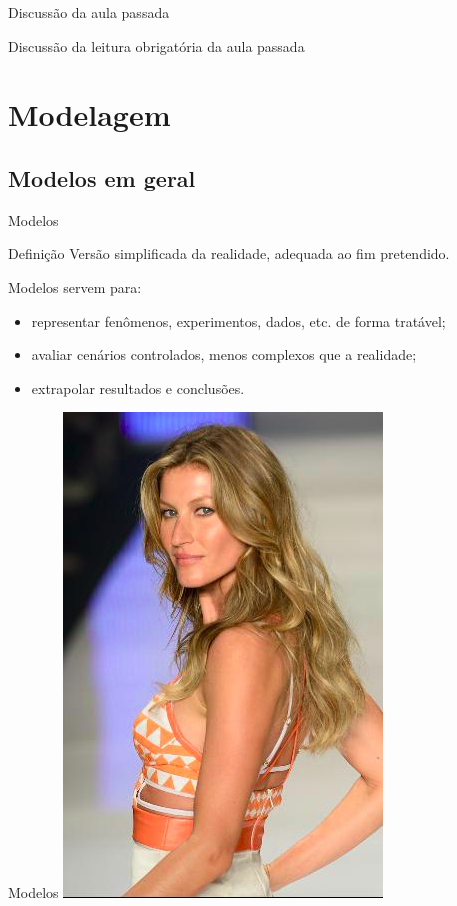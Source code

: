 \documentclass{beamer}
\begin{document}

\begin{frame}{\scriptsize Discussão da aula passada}
  \begin{block}{}
    Discussão da leitura obrigatória da aula passada
  \end{block}
\end{frame}

\section{Modelagem}

\subsection{Modelos em geral}

\begin{frame}{\scriptsize Modelos}
  \begin{block}{Definição}
    \footnotesize
    Versão simplificada da realidade, adequada ao fim pretendido.
  \end{block}
  \bigskip
  \small
  Modelos servem para:
  \begin{itemize}
    \footnotesize
  \item representar fenômenos, experimentos, dados, etc. de \alert{forma tratável};
  \item avaliar cenários controlados, menos complexos que a realidade;
  \item extrapolar resultados e conclusões.
  \end{itemize}
\end{frame}

\begin{frame}{\scriptsize Modelos}
  \centering
  \includegraphics[height=\textheight]{Cap18-19/gi}
\end{frame}
\end{document}
